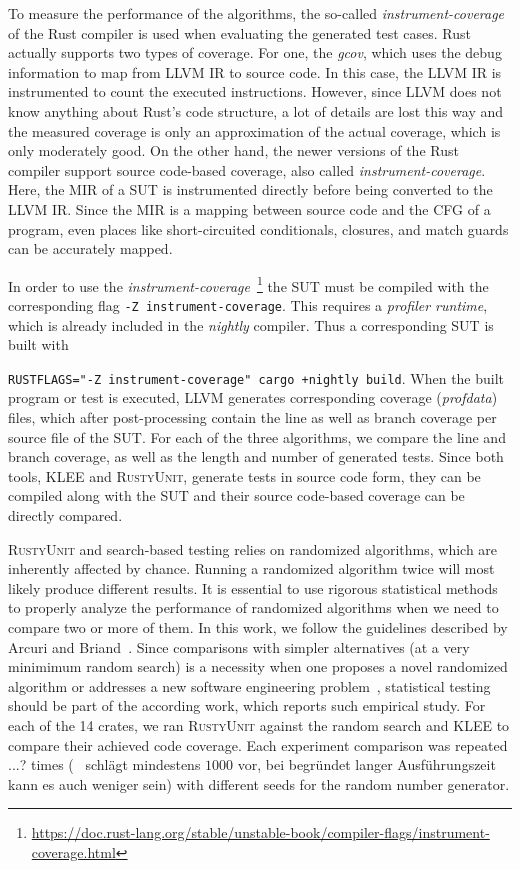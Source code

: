 \documentclass[paper=a4,%
  twoside,%
  BCOR4mm,%
  abstract=true,%
  toc=bibliography,%
  chapterprefix=true,%
  toc=bibliographynumbered,%
  open=right,%
  english,%
  pagesize=pdftex]{scrreprt}
\newcommand{\tech}{\textsc{RustyUnit}\xspace}
\newcommand{\mir}{\ac{MIR}\xspace}
\newcommand{\cfg}{\ac{CFG}\xspace}
\begin{document}
To measure the performance of the algorithms, the so-called \textit{instrument-coverage} of the Rust compiler is used when evaluating the generated test cases. Rust actually supports two types of coverage. For one, the \textit{gcov}, which uses the debug information to map from LLVM \ac{IR} to source code. In this case, the LLVM \ac{IR} is instrumented to count the executed instructions. However, since LLVM does not know anything about Rust's code structure, a lot of details are lost this way and the measured coverage is only an approximation of the actual coverage, which is only moderately good. On the other hand, the newer versions of the Rust compiler support source code-based coverage, also called \textit{instrument-coverage}. Here, the \mir of a \ac{SUT} is instrumented directly before being converted to the LLVM \ac{IR}. Since the \mir is a mapping between source code and the \cfg of a program, even places like short-circuited conditionals, closures, and match guards can be accurately mapped.

In order to use the \textit{instrument-coverage}~\footnote{\url{https://doc.rust-lang.org/stable/unstable-book/compiler-flags/instrument-coverage.html}} the SUT must be compiled with the corresponding flag \texttt{-Z instrument-coverage}. This requires a \textit{profiler runtime}, which is already included in the \textit{nightly} compiler. Thus a corresponding SUT is built with \raggedright\texttt{RUSTFLAGS="-Z instrument-coverage" cargo +nightly build}. When the built program or test is executed, LLVM generates corresponding coverage (\emph{profdata}) files, which after post-processing contain the line as well as branch coverage per source file of the \ac{SUT}. For each of the three algorithms, we compare the line and branch coverage, as well as the length and number of generated tests. Since both tools, \textsc{KLEE} and \tech, generate tests in source code form, they can be compiled along with the \ac{SUT} and their source code-based coverage can be directly compared.

\tech and search-based testing relies on randomized algorithms, which are inherently affected by chance. Running a randomized algorithm twice will most likely produce different results. It is essential to use rigorous statistical methods to properly analyze the performance of randomized algorithms when we need to compare two or more of them. In this work, we follow the guidelines described by Arcuri and Briand~\cite{Arcuri2011}. Since comparisons with simpler alternatives (at a very minimimum random search) is a necessity when one proposes a novel randomized algorithm or addresses a new software engineering problem~\cite{Ali2010}, statistical testing should be part of the according work, which reports such empirical study. For each of the 14 crates, we ran \tech against the random search and \textsc{KLEE} to compare their achieved code coverage. Each experiment comparison was repeated ...? times (~\cite{Arcuri2011} schlägt mindestens $1000$ vor, bei begründet langer Ausführungszeit kann es auch weniger sein) with different seeds for the random number generator.
\end{document}
